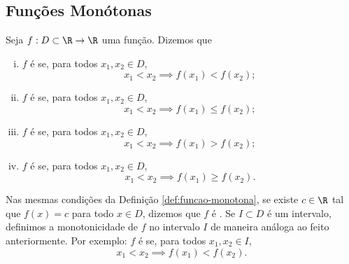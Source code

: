 \subsection{Funções Monótonas}

\begin{definition}
\label{def:funcao-monotona}
    Seja $f: D \subset \R \to \R$ uma função. Dizemos que
\begin{enumerate}[(i)]
  \item $f$ é  se, para todos $x_1, x_2 \in D$,
  $$x_1 < x_2 \implies f(x_1) < f(x_2);$$
  \item $f$ é  se, para todos $x_1, x_2 \in D$,
  $$x_1 < x_2 \implies f(x_1) \leq f(x_2);$$
  \item $f$ é  se, para todos $x_1, x_2 \in D$,
  $$x_1 < x_2 \implies f(x_1) > f(x_2);$$
  \item $f$ é  se, para todos $x_1, x_2 \in D$,
  $$x_1 < x_2 \implies f(x_1) \geq f(x_2).$$
\end{enumerate}
\end{definition}

Nas mesmas condições da Definição \ref{def:funcao-monotona}, se existe $c \in \R$ tal que $f(x) = c$ para todo $x \in D$, dizemos que $f$ é .
Se $I \subset D$ é um intervalo, definimos a monotonicidade de $f$
no intervalo $I$ de maneira análoga ao feito anteriormente. Por
exemplo:
$f$ é  se, para todos
$x_1, x_2 \in I$,
  $$x_1 < x_2 \implies f(x_1) < f(x_2).$$